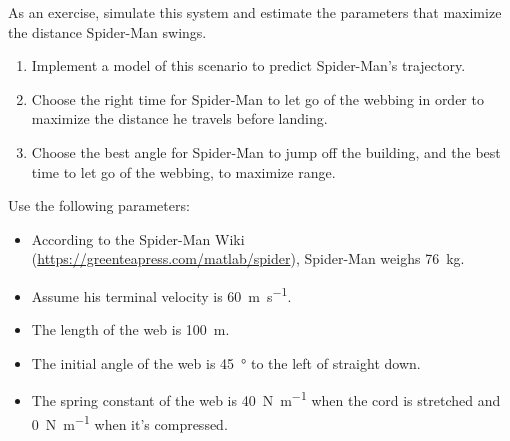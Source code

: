 \begin{ex}

As an exercise, simulate this system and estimate the parameters that maximize the distance Spider-Man swings.

\begin{enumerate}

\item
  Implement a model of this scenario to predict Spider-Man's trajectory.


\item
  Choose the right time for Spider-Man to let go of the webbing in order to maximize the distance he travels before landing.


\item
  Choose the best angle for Spider-Man to jump off the building, and the best time to let go of the webbing, to maximize range.


\end{enumerate}

Use the following parameters:


\begin{itemize}

\item According to the Spider-Man Wiki (\url{https://greenteapress.com/matlab/spider}), Spider-Man weighs \SI{76}{\kg}.

\item Assume his terminal velocity is \SI{60}{\meter\per\second}.


\item  The length of the web is \SI{100}{\meter}.

\item  The initial angle of the web is \SI{45}{\degree} to the left of straight
  down.

\item  The spring constant of the web is \SI{40}{\newton\per\meter} when the cord is stretched and \SI{0}{\newton\per\meter} when it's compressed.


\end{itemize}

\end{ex}


